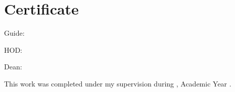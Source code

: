 \section*{Certificate}
\thesistitle\par
Guide: \projguidename\quad\projguidedesignation\par
HOD: \hodname\quad\hoddept\par
Dean: \deanname\par
This work was completed under my supervision during \semester, Academic Year \academicyear.
\clearpage
